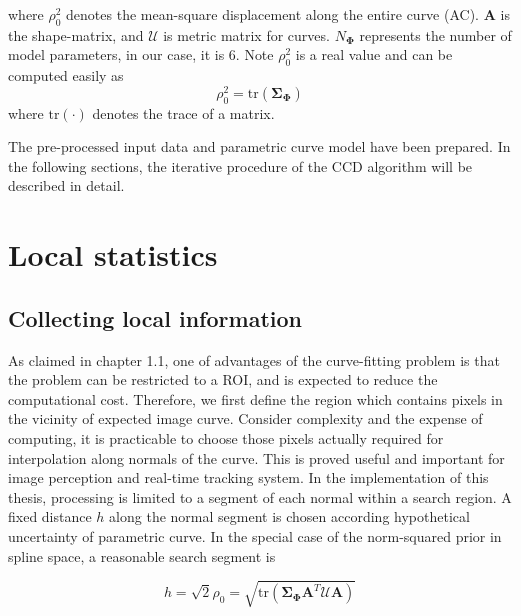 where $\rho_0^2$ denotes the mean-square displacement along the entire
curve (AC). $\mathbf{A}$ is the shape-matrix, and $\mathcal{U}$ is
metric matrix for curves. $N_{\mathbf{\Phi}}$ represents
the number of model parameters, in our case, it is 6. Note $\rho_0^2$
is a real value and can be computed easily as 
\begin{equation}
  \label{eq:5.3}
  \rho_0^2 = \mathrm{tr}(\mathbf{\Sigma}_{\mathbf{\Phi}})
\end{equation}
where $\mathrm{tr}(\cdot)$ denotes the trace of a matrix.

The pre-processed input data and parametric curve model have been
prepared. In the following sections, the iterative procedure of the
CCD algorithm will be described in detail.

\section{Local statistics}
\label{sec:ls}

\subsection{Collecting local information}
\label{sec:cls}


As claimed in chapter 1.1, one of advantages of the curve-fitting
problem is that the problem can be restricted to a ROI, and is
expected to reduce the computational cost. Therefore, we first define
the region which contains pixels in the vicinity of expected image
curve. 
Consider complexity and the expense of computing, it is practicable
to choose those pixels actually required for interpolation along
normals of the curve. This is proved useful and important for image
perception and real-time tracking system. In the implementation of
this thesis, processing is limited to a segment of each normal within
a search region. A fixed distance $h$ along the normal segment is
chosen according hypothetical uncertainty of parametric curve. In the
special case of the norm-squared prior in spline space, a reasonable
search segment is 

\begin{equation}
  \label{eq:5.4}
  h = \sqrt{2} \rho_0 = \sqrt{\mathrm{tr}(\mathbf{\Sigma}_{\mathbf{\Phi}}\mathbf{A}^T\mathcal{U}\mathbf{A})}
\end{equation}

